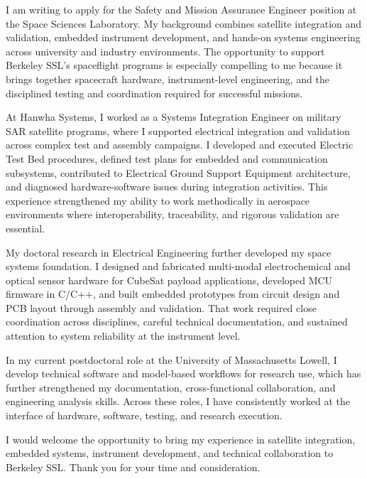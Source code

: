\documentclass[letterpaper,11pt]{moderncv}
\date{\today}
\begin{document}
\makelettertitle

I am writing to apply for the Safety and Mission Assurance Engineer position at the Space Sciences Laboratory. My background combines satellite integration and validation, embedded instrument development, and hands-on systems engineering across university and industry environments. The opportunity to support Berkeley SSL's spaceflight programs is especially compelling to me because it brings together spacecraft hardware, instrument-level engineering, and the disciplined testing and coordination required for successful missions.

At Hanwha Systems, I worked as a Systems Integration Engineer on military SAR satellite programs, where I supported electrical integration and validation across complex test and assembly campaigns. I developed and executed Electric Test Bed procedures, defined test plans for embedded and communication subsystems, contributed to Electrical Ground Support Equipment architecture, and diagnosed hardware-software issues during integration activities. This experience strengthened my ability to work methodically in aerospace environments where interoperability, traceability, and rigorous validation are essential.

My doctoral research in Electrical Engineering further developed my space systems foundation. I designed and fabricated multi-modal electrochemical and optical sensor hardware for CubeSat payload applications, developed MCU firmware in C/C++, and built embedded prototypes from circuit design and PCB layout through assembly and validation. That work required close coordination across disciplines, careful technical documentation, and sustained attention to system reliability at the instrument level.

In my current postdoctoral role at the University of Massachusetts Lowell, I develop technical software and model-based workflows for research use, which has further strengthened my documentation, cross-functional collaboration, and engineering analysis skills. Across these roles, I have consistently worked at the interface of hardware, software, testing, and research execution.

I would welcome the opportunity to bring my experience in satellite integration, embedded systems, instrument development, and technical collaboration to Berkeley SSL. Thank you for your time and consideration.

\makeletterclosing
\end{document}
